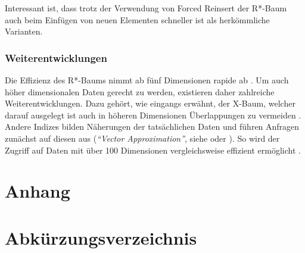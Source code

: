\documentclass[runningheads,a4paper]{llncs}
\begin{document}
	Interessant ist, dass trotz der Verwendung von Forced Reinsert der R*-Baum auch beim Einfügen von neuen Elementen schneller ist als herkömmliche Varianten.
	

	\subsubsection{Weiterentwicklungen} %
	\label{ssub:weiterentwicklungen}

	Die Effizienz des R*-Baums nimmt ab fünf Dimensionen rapide ab \citep[vgl.][29]{Kriegel:1996}. Um auch höher dimensionalen Daten gerecht zu werden, existieren daher zahlreiche Weiterentwicklungen. Dazu gehört, wie eingangs erwähnt, der X-Baum, welcher darauf ausgelegt ist auch in höheren Dimensionen Überlappungen zu vermeiden \citep[vgl.][]{Kriegel:1996}.
	Andere Indizes bilden Näherungen der tatsächlichen Daten und führen Anfragen zunächst auf diesen aus (\emph{\enquote{Vector Approximation}}, siehe \cite{Gibas:2008} oder \cite{Daoudi:2008}). So wird der Zugriff auf Daten mit über 100 Dimensionen vergleichsweise effizient ermöglicht \citep[vgl.][]{Daoudi:2008}.
	




\newpage
\begin{appendix}

	\section*{Anhang}

	\section*{Abkürzungsverzeichnis} %
	\label{sub:abbreviations}

		\begin{acronym}[length]
	  \end{acronym}



	\nocite{*}							%

	\printbibliography

\end{appendix}
\end{document}
